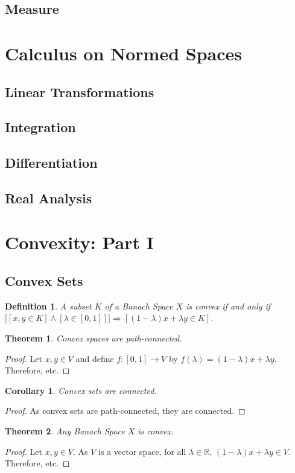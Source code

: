 \documentclass[12pt,oneside]{book}
\theoremstyle{mystyle}
\newtheorem{theorem}{Theorem}[section]
\newtheorem{definition}{Definition}[section]
\newtheorem{corollary}{Corollary}[section]
\begin{document}
\subsection{Measure}
%
\section{Calculus on Normed Spaces}
%
\subsection{Linear Transformations}
%
\subsection{Integration}
%
\subsection{Differentiation}
%
\subsection{Real Analysis}
%
\section{Convexity: Part I}
%
\subsection{Convex Sets}
%
\begin{definition}
A subset $K$ of a Banach Space $X$ is convex if and only if $\big[[x,y\in K]\land  [\lambda \in [0,1]]\big]\Rightarrow[(1-\lambda)x+\lambda y\in K]$.
\end{definition}
%
\begin{theorem}
Convex spaces are path-connected.
\end{theorem}
\begin{proof}
Let $x,y\in V$ and define $f:[0,1]\rightarrow V$ by $f(\lambda) = (1-\lambda)x+\lambda y$. Therefore, etc.
\end{proof}

\begin{corollary}
Convex sets are connected.
\end{corollary}
\begin{proof}
As convex sets are path-connected, they are connected.
\end{proof}

\begin{theorem}
Any Banach Space $X$ is convex.
\end{theorem}
\begin{proof}
Let $x,y\in V$. As $V$ is a vector space, for all $\lambda \in \mathbb{R}$, $(1-\lambda)x+\lambda y\in V$. Therefore, etc.
\end{proof}
\end{document}
